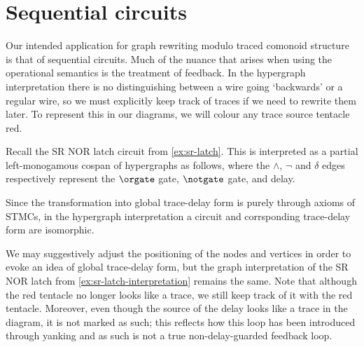 \section{Sequential circuits}

Our intended application for graph rewriting modulo traced
comonoid structure is that of sequential circuits.
Much of the nuance that arises when using the operational semantics is the
treatment of feedback.
In the hypergraph interpretation there is no distinguishing between a wire going
`backwards' or a regular wire, so we must explicitly keep track of traces if we
need to rewrite them later.
To represent this in our diagrams, we will colour any trace source tentacle red.

\begin{example}\label{ex:sr-latch-interpretation}
    Recall the SR NOR latch circuit from \cref{ex:sr-latch}.
    This is interpreted as a partial left-monogamous cospan of hypergraphs as
    follows, where the \(\wedge\), \(\neg\) and \(\delta\) edges respectively
    represent the \(\orgate\) gate, \(\notgate\) gate, and delay.
    \begin{center}
    \end{center}
\end{example}

Since the transformation into global trace-delay form is purely through axioms
of STMCs, in the hypergraph interpretation a circuit and corrsponding
trace-delay form are isomorphic.

\begin{example}
    We may suggestively adjust the positioning of the nodes and vertices in
    order to evoke an idea of global trace-delay form, but the graph
    interpretation of the SR NOR latch from \cref{ex:sr-latch-interpretation}
    remains the same.
    Note that although the red tentacle no longer looks like a trace, we still
    keep track of it with the red tentacle.
    Moreover, even though the source of the delay looks like a trace in the
    diagram, it is not marked as such; this reflects how this loop has been
    introduced through yanking and as such is not a true non-delay-guarded
    feedback loop.
    \begin{center}
    \end{center}
\end{example}

